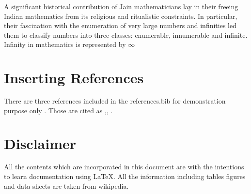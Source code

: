 \documentclass[12pt,a4paper]{article}
\begin{document}
A significant historical contribution of Jain mathematicians lay in their freeing Indian mathematics from its religious and ritualistic constraints. In particular, their fascination with the enumeration of very large numbers and infinities led them to classify numbers into three classes: enumerable, innumerable and infinite. Infinity in mathematics is represented by $\infty$

\section{Inserting References}
There are three references included in the references.bib for demonstration purpose only . Those are cited as \cite{vanet},\cite{adhoc1}, \cite{xmpp}.





\section*{Disclaimer}
All the contents which are incorporated in this document are with the intentions to learn documentation using \LaTeX. All the information including tables figures and data sheets are taken from wikipedia. 
\end{document}
